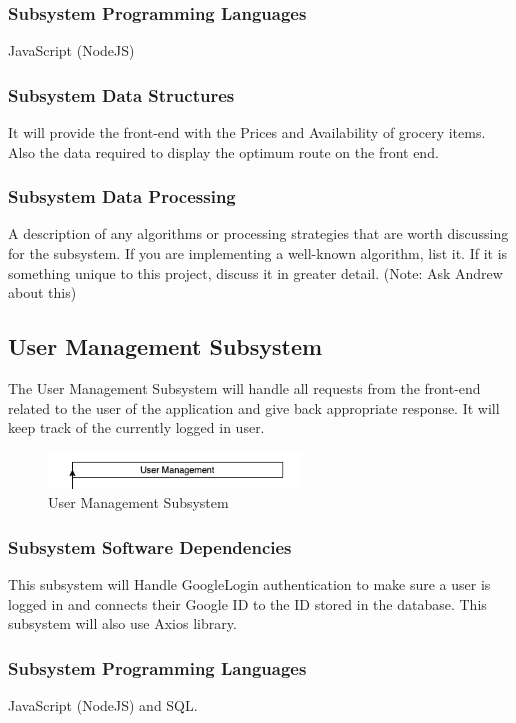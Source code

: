\subsubsection{Subsystem Programming Languages}
JavaScript (NodeJS)

\subsubsection{Subsystem Data Structures}
It will provide the front-end with the Prices and Availability of grocery items. Also the data required to display the optimum route on the front end.

\subsubsection{Subsystem Data Processing}
A description of any algorithms or processing strategies that are worth discussing for the subsystem. If you are implementing a well-known algorithm, list it. If it is something unique to this project, discuss it in greater detail. 
(Note: Ask Andrew about this)


\subsection{User Management Subsystem}
The User Management Subsystem will handle all requests from the front-end related to the user of the
application and give back appropriate response. It will keep track of the currently logged in user.

\begin{figure}[h!]
	\centering
 	\includegraphics[width=0.60\textwidth]{images/UserManagement.png}
 \caption{User Management Subsystem}
\end{figure}


\subsubsection{Subsystem Software Dependencies}
This subsystem will Handle GoogleLogin authentication to make sure a user is logged in and connects their Google ID to the ID stored in the database. This subsystem will also use Axios library.

\subsubsection{Subsystem Programming Languages}
JavaScript (NodeJS) and SQL.

